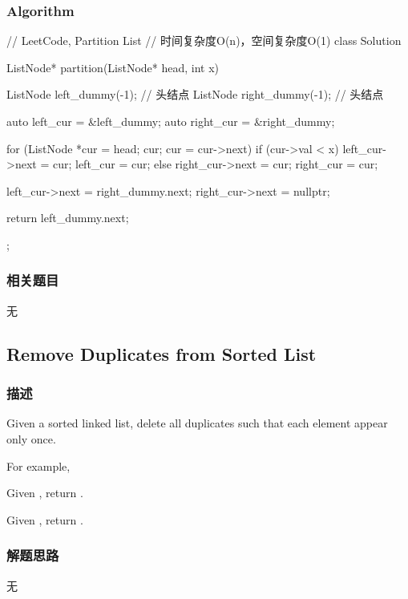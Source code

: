\subsubsection{Algorithm}
\begin{Code}
	// LeetCode, Partition List
	// 时间复杂度O(n)，空间复杂度O(1)
	class Solution {
		ListNode* partition(ListNode* head, int x) {
			ListNode left_dummy(-1); // 头结点
			ListNode right_dummy(-1); // 头结点
			
			auto left_cur = &left_dummy;
			auto right_cur = &right_dummy;
			
			for (ListNode *cur = head; cur; cur = cur->next) {
				if (cur->val < x) {
					left_cur->next = cur;
					left_cur = cur;
				} else {
					right_cur->next = cur;
					right_cur = cur;
				}
			}
		
			left_cur->next = right_dummy.next;
			right_cur->next = nullptr;
		
			return left_dummy.next;
		}
	};
\end{Code}


\subsubsection{相关题目}

\begindot
\item 无
\myenddot


\subsection{Remove Duplicates from Sorted List}
\label{sec:remove-duplicates-from-sorted-list}


\subsubsection{描述}
Given a sorted linked list, delete all duplicates such that each element appear 
only once.

For example,

Given , return .

Given , return .


\subsubsection{解题思路}
无


